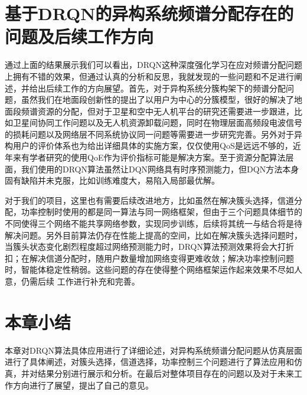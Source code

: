 \section{基于DRQN的异构系统频谱分配存在的问题及后续工作方向}
通过上面的结果展示我们可以看出，DRQN这种深度强化学习在应对频谱分配问题上拥有不错的效果，但通过认真的分析和反思，我就发现的一些问题和不足进行阐述，并给出后续工作的方向展望。首先，对于异构系统分簇构架下的频谱分配问题，虽然我们在地面段创新性的提出了以用户为中心的分簇模型，很好的解决了地面段频谱资源的分配，但对于卫星和空中无人机平台的研究还需要进一步跟进，比如卫星间协同工作问题以及无人机资源卸载问题，同时在物理层面高频段电波信号的损耗问题以及网络层不同系统协议同一问题等需要进一步研究完善。另外对于异构用户的评价体系也为给出详细具体的实施方案，仅仅使用QoS是远远不够的，近年来有学者研究的使用QoE作为评价指标可能是解决方案。至于资源分配算法层面，我们使用的DRQN算法虽然让DQN网络具有时序预测能力，但DQN方法本身固有缺陷并未克服，比如训练难度大，易陷入局部最优解。

对于我们的项目，这里也有需要后续改进地方，比如虽然在解决簇头选择，信道分配，功率控制时使用的都是同一算法与同一网络框架，但由于三个问题具体细节的不同使得三个网络不能共享网络参数，实现同步训练，后续将其统一与结合将是待解决问题。另外目前算法仍存在性能上提高的空间，比如在解决簇头选择问题时，当簇头状态变化剧烈程度超过网络预测能力时，DRQN算法预测效果将会大打折扣；在解决信道分配时，随用户数量增加网络变得更难收敛；解决功率控制问题时，智能体稳定性稍弱。这些问题的存在使得整个网络框架运作起来效果不尽如人意，仍需后续 工作进行补充和完善。

\section{本章小结}
本章对DRQN算法具体应用进行了详细论述，对异构系统频谱分配问题从仿真层面进行了具体阐述，对簇头选择，信道选择，功率控制三个问题进行了算法应用和仿真，并对结果分别进行展示和分析。在最后对整体项目存在的问题以及对于未来工作方向进行了展望，提出了自己的意见。





















